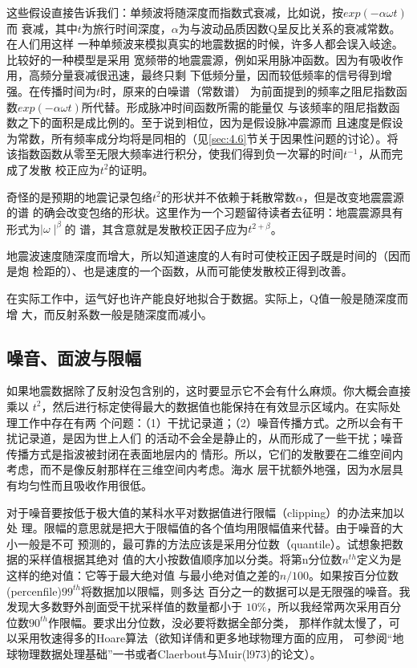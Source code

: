这些假设直接告诉我们：单频波将随深度而指数式衰减，比如说，按$exp(-\alpha \omega t)$而
衰减，其中$t$为旅行时间深度，$\alpha$为与波动品质因数Q呈反比关系的衰减常数。在人们用这样
一种单频波来模拟真实的地震数据的时候，许多人都会误入岐途。比较好的一种模型是采用
宽频带的地震震源，例如采用脉冲函数。因为有吸收作用，高频分量衰减很迅速，最终只剩
下低频分量，因而较低频率的信号得到增强。在传播时间为$t$时，原来的白噪谱（常数谱）
为前面提到的频率之阻尼指数函数$exp(-\alpha\omega t)$所代替。形成脉冲时间函数所需的能量仅
与该频率的阻尼指数函数之下的面积是成比例的。至于说到相位，因为是假设脉冲震源而
且速度是假设为常数，所有频率成分均将是同相的（见\ref{sec:4.6}节关于因果性问题的讨论）。将
该指数函数从零至无限大频率进行积分，使我们得到负一次幂的时间$t^{-1}$，从而完成了发散
校正应为$t^2$的证明。

奇怪的是预期的地震记录包络$t^2$的形状并不依赖于耗散常数$\alpha$，但是改变地震震源的谱
的确会改变包络的形状。这里作为一个习题留待读者去征明：地震震源具有形式为$\mid \omega \mid^\beta$的
谱，其含意就是发散校正因子应为$t^{2+\beta}$。

地震波速度随深度而增大，所以知道速度的人有时可使校正因子既是时间的（因而是炮
检距的）、也是速度的一个函数，从而可能使发散校正得到改善。

在实际工作中，运气好也许产能良好地拟合于数据。实际上，Q值一般是随深度而增
大，而反射系数一般是随深度而减小。

\subsection{噪音、面波与限幅}
\label{sec:4.1.2}

如果地震数据除了反射没包含别的，这时要显示它不会有什么麻烦。你大概会直接乘以
$t^2$，然后进行标定使得最大的数据值也能保持在有效显示区域内。在实际处理工作中存在有两
个问题：（1）干扰记录道；（2）噪音传播方式。之所以会有干扰记录道，是因为世上人们
的活动不会全是静止的，从而形成了一些干扰；噪音传播方式是指波被封闭在表面地层内的
情形。所以，它们的发散要在二维空间内考虑，而不是像反射那样在三维空间内考虑。海水
层干扰额外地强，因为水层具有均匀性而且吸收作用很低。

对于噪音要按低于极大值的某科水平对数据值进行限幅（clipping）的办法来加以处
理。限幅的意思就是把大于限幅值的各个值均用限幅值来代替。由于噪音的大小一般是不可
预测的，最可靠的方法应该是采用分位数（quantile）。试想象把数据的采样值根据其绝对
值的大小按数值顺序加以分类。将第n分位数$n^{th}$定义为是这样的绝对值：它等于最大绝对值
与最小绝对值之差的$n/100$。如果按百分位数(percenfile)$99^{th}$将数据加以限幅，则多达
百分之一的数据可以是无限强的噪音。我发现大多数野外剖面受干扰采样值的数量都小于
$10\%$，所以我经常两次采用百分位数$90^{th}$作限幅。要求出分位数，没必要将数据全部分类，
那样作就太慢了，可以采用牧速得多的Hoare算法（欲知详倩和更多地球物理方面的应用，
可参阅“地球物理数据处理基础”一书或者Claerbout与Muir(l973)的论文）。

